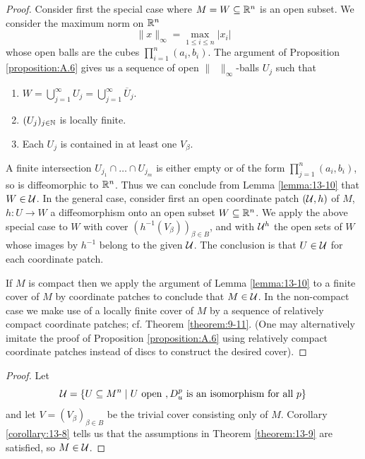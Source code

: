 \begingroup 
\def\proofname{\textup{\bfseries Proof of Theorem \ref{theorem:13-9}}}
\begin{proof}
Consider first the special case where $M = W\subseteq {\ensuremath{\mathbb{R}}}^n$ is an open subset. We consider the maximum 
norm on ${\mathbb{R}}^n$
\[
  \|x\|_\infty = \max_{1\le i\le n}|x_i|
\]
whose open balls are the cubes $\prod_{i=1}^n(a_i, b_i)$. The argument of Proposition \ref{proposition:A.6}
gives us a sequence of open $\|\;\;\|_\infty$-balls $U_j$ such that
\begin{enumerate}
  \item $W = \bigcup_{j=1}^\infty U_j=\bigcup_{j=1}^\infty \overline{U}_j$.
  \item $(U_j)_{j\in{\ensuremath{\mathbb{N}}}}$ is locally finite.
  \item Each $U_j$ is contained in at least one $V_\beta$.
\end{enumerate}

A finite intersection $U_{j_1}\cap\ldots\cap U_{j_m}$ is either empty or of the form $\prod_{j=1}^n(a_i, b_i)$, so
is diffeomorphic to ${\mathbb{R}}^n$. Thus we can conclude from Lemma \ref{lemma:13-10} that $W\in\mathcal{U}$. In the general case, 
consider first an open coordinate patch $(\mathcal{U}, h)$ of $M$, $h:U\to W$ a diffeomorphism onto an open subset $W\subseteq{\ensuremath{\mathbb{R}}}^n$. 
We apply the above special case to $W$ with cover $(h^{-1}(V_\beta))_{\beta\in B}$, and with $\mathcal{U}^h$ the open sets of $W$ 
whose images by $h^{-1}$ belong to the given $\mathcal{U}$. The conclusion is that $U\in\mathcal{U}$ for each coordinate
patch.

If $M$ is compact then we apply the argument of Lemma \ref{lemma:13-10} to a finite cover
of $M$ by coordinate patches to conclude that $M\in\mathcal{U}$. In the non-compact case
we make use of a locally finite cover of $M$ by a sequence of relatively compact
coordinate patches; cf. Theorem \ref{theorem:9-11}. (One may alternatively imitate the proof
of Proposition \ref{proposition:A.6} using relatively compact coordinate patches instead of discs to
construct the desired cover).
\end{proof}
\endgroup

\begingroup 
\def\proofname{\textup{\bfseries Proof of Theorem \ref{theorem:13-5}}}
\begin{proof}
Let 
\[
  \mathcal{U} = \{U\subseteq M^n \mid U \text{ open }, D_u^p \text{ is an isomorphism for all } p\}
\]
and let $V = (V_\beta)_{\beta\in B}$ be the trivial cover consisting only of $M$. Corollary \ref{corollary:13-8}
tells us that the assumptions in Theorem \ref{theorem:13-9} are satisfied, so $M\in\mathcal{U}$.
\end{proof}
\endgroup


